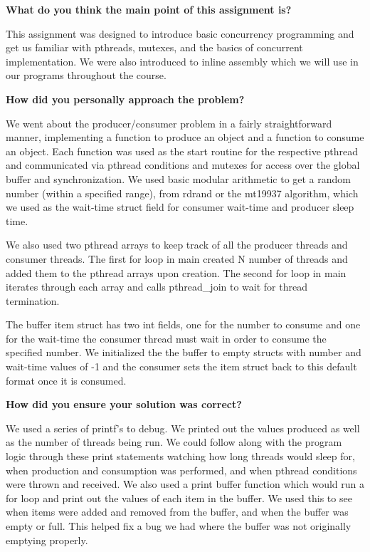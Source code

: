 \documentclass[10pt,letterpaper,draftclsnofoot,onecolumn]{IEEEtran}
\begin{document}
\bigskip

\noindent\textbf{What do you think the main point of this assignment is?}
\medskip

\noindent This assignment was designed to introduce basic concurrency programming and get us familiar with pthreads, mutexes, and the basics of concurrent implementation. We were also introduced to inline assembly which we will use in our programs throughout the course.\par
\medskip

\bigskip

\noindent\textbf{How did you personally approach the problem?}
\medskip

\noindent We went about the producer/consumer problem in a fairly straightforward manner, implementing a function to produce an object and a function to consume an object. Each function was used as the start routine for the respective pthread and communicated via pthread conditions and mutexes for access over the global buffer and synchronization. We used basic modular arithmetic to get a random number (within a specified range), from rdrand or the mt19937 algorithm, which we used as the wait-time struct field for consumer wait-time and producer sleep time.\par
\medskip
\noindent We also used two pthread arrays to keep track of all the producer threads and consumer threads. The first for loop in main created N number of threads and added them to the pthread arrays upon creation. The second for loop in main iterates through each array and calls pthread\_join to wait for thread termination.\par
\medskip
\noindent The buffer item struct has two int fields, one for the number to consume and one for the wait-time the consumer thread must wait in order to consume the specified number. We initialized the the buffer to empty structs with number and wait-time values of -1 and the consumer sets the item struct back to this default format once it is consumed.\par\pagebreak

\noindent\textbf{How did you ensure your solution was correct?}
\medskip

\noindent We used a series of printf's to debug. We printed out the values produced as well as the number of threads being run. We could follow along with the program logic through these print statements watching how long threads would sleep for, when production and consumption was performed, and when pthread conditions were thrown and received. We also used a print buffer function which would run a for loop and print out the values of each item in the buffer. We used this to see when items were added and removed from the buffer, and when the buffer was empty or full. This helped fix a bug we had where the buffer was not originally emptying properly.\par
\medskip
\end{document}
